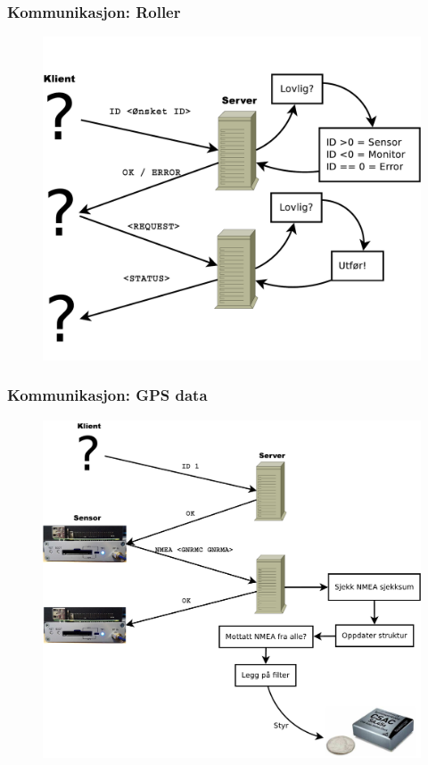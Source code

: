 \documentclass[xcolor=table]{beamer}
\begin{document}
\begin{frame}
  \frametitle{Kommunikasjon: Roller}
    \begin{figure}
      \includegraphics[scale=0.3]{thesis/graphics/server_explain.pdf}
    \end{figure}
\end{frame}

\begin{frame}
  \frametitle{Kommunikasjon: GPS data}
    \begin{figure}
      \includegraphics[scale=0.25]{thesis/graphics/sensor_nmea.pdf}
    \end{figure}
\end{frame}
\end{document}
